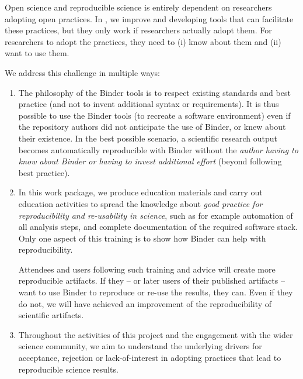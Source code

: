 \begin{workpackage}

\begin{wpdescription}

  Open science and reproducible science is entirely dependent on researchers
  adopting open practices. In \TheProject, we improve and developing tools that
  can facilitate these practices, but they only work if researchers actually adopt
  them. For researchers to adopt the practices, they need to (i) know about them
  and (ii) want to use them.

  We address this challenge in multiple ways:
  \begin{enumerate}
  \item The philosophy of the Binder tools is to respect existing standards and
    best practice (and not to invent additional syntax or requirements). It is
    thus possible to use the Binder tools (to recreate a software environment)
    even if the repository authors did not anticipate the use of Binder, or knew
    about their existence. In the best possible scenario, a scientific research
    output becomes automatically reproducible with Binder without the
    \emph{author having to know about Binder or having to invest additional
      effort} (beyond following best practice).

    \item In this work package, we produce education materials and carry out
      education activities to spread the knowledge about \emph{good practice for
        reproducibility and re-usability in science}, such as for example
      automation of all analysis steps, and complete documentation of the
      required software stack. Only one aspect of this training is to show how
      Binder can help with reproducibility.

      Attendees and users following such training and advice will create more
      reproducible artifacts. If they -- or later users of their published
      artifacts -- want to use Binder to reproduce or re-use the results, they
      can. Even if they do not, we will have achieved an improvement of the
      reproducibility of scientific artifacts.

    \item Throughout the activities of this project and the engagement with the
      wider science community, we aim to understand the underlying drivers for
      acceptance, rejection or lack-of-interest in adopting practices that lead
      to reproducible science results.
  \end{enumerate}


\end{wpdescription}
\end{workpackage}
